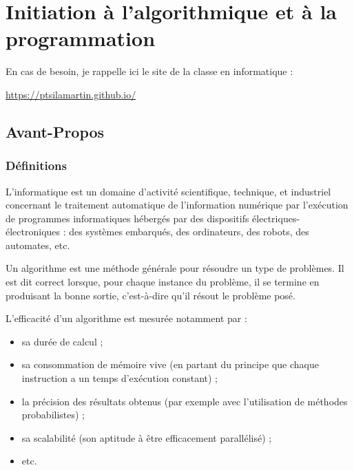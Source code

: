 \setchapterpreamble[u]{\margintoc}
\chapter{Initiation à l'algorithmique et à la programmation}

\begin{center}
En cas de besoin, je rappelle ici le site de la classe en informatique : 

\url{https://ptsilamartin.github.io/}
\end{center}


\section{Avant-Propos}
\subsection{Définitions}

\begin{defi}
L'informatique est un domaine d'activité scientifique, technique, et industriel concernant le traitement automatique de l'information numérique par l'exécution de programmes informatiques hébergés par des dispositifs électriques-électroniques : des systèmes embarqués, des ordinateurs, des robots, des automates, etc.
\end{defi}

\begin{defi}
Un algorithme est une méthode générale pour résoudre un type de problèmes. Il est dit correct lorsque, pour chaque instance du problème, il se termine en produisant la bonne sortie, c'est-à-dire qu'il résout le problème posé.
\end{defi}

L'efficacité d'un algorithme est mesurée notamment par :
\begin{itemize}
\item sa durée de calcul ;
\item sa consommation de mémoire vive (en partant du principe que chaque instruction a un temps d'exécution constant) ;
\item la précision des résultats obtenus (par exemple avec l'utilisation de méthodes probabilistes) ;
\item sa scalabilité (son aptitude à être efficacement parallélisé) ;
\item etc.
\end{itemize}

